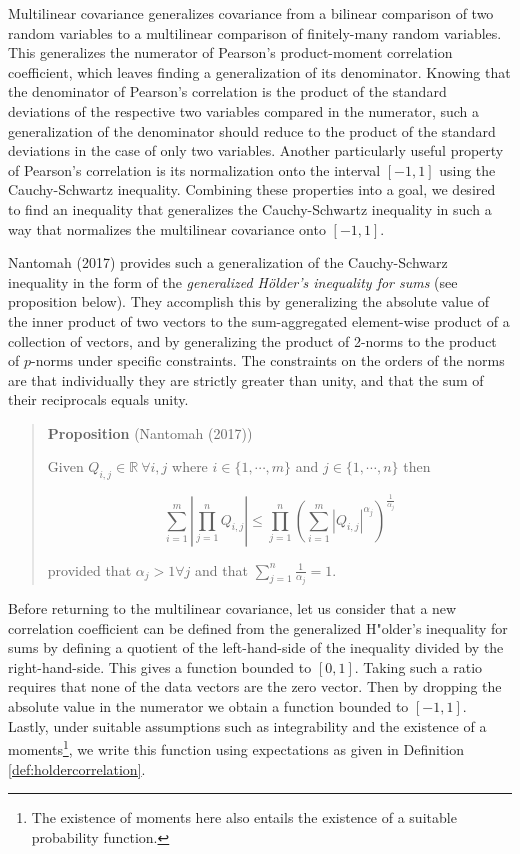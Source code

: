 \documentclass[
  letterpaper,
  DIV=11,
  numbers=noendperiod]{scrreprt}
\begin{document}
Multilinear covariance generalizes covariance from a bilinear comparison
of two random variables to a multilinear comparison of finitely-many
random variables. This generalizes the numerator of Pearson's
product-moment correlation coefficient, which leaves finding a
generalization of its denominator. Knowing that the denominator of
Pearson's correlation is the product of the standard deviations of the
respective two variables compared in the numerator, such a
generalization of the denominator should reduce to the product of the
standard deviations in the case of only two variables. Another
particularly useful property of Pearson's correlation is its
normalization onto the interval \([-1,1]\) using the Cauchy-Schwartz
inequality. Combining these properties into a goal, we desired to find
an inequality that generalizes the Cauchy-Schwartz inequality in such a
way that normalizes the multilinear covariance onto \([-1,1]\).

Nantomah (2017) provides such a generalization of the Cauchy-Schwarz
inequality in the form of the \emph{generalized Hölder's inequality for
sums} (see proposition below). They accomplish this by generalizing the
absolute value of the inner product of two vectors to the sum-aggregated
element-wise product of a collection of vectors, and by generalizing the
product of 2-norms to the product of \(p\)-norms under specific
constraints. The constraints on the orders of the norms are that
individually they are strictly greater than unity, and that the sum of
their reciprocals equals unity.

\begin{quote}
\textbf{Proposition} (Nantomah (2017))

Given \(Q_{i,j} \in \mathbb{R}\ \forall i,j\) where
\(i \in \{ 1, \cdots, m \}\) and \(j \in \{ 1, \cdots, n \}\) then

\[\sum_{i=1}^{m} \left|\prod_{j=1}^{n} Q_{i,j}\right| \leq \prod_{j=1}^{n} \left( \sum_{i=1}^{m} |Q_{i,j}|^{\alpha_j} \right)^{\frac{1}{\alpha_j}}\]

provided that \(\alpha_j > 1 \forall j\) and that
\(\sum_{j=1}^{n} \frac{1}{\alpha_j} = 1\).
\end{quote}

Before returning to the multilinear covariance, let us consider that a
new correlation coefficient can be defined from the generalized
H"older's inequality for sums by defining a quotient of the
left-hand-side of the inequality divided by the right-hand-side. This
gives a function bounded to \([0,1]\). Taking such a ratio requires that
none of the data vectors are the zero vector. Then by dropping the
absolute value in the numerator we obtain a function bounded to
\([-1,1]\). Lastly, under suitable assumptions such as integrability and
the existence of a
moments\footnote{The existence of moments here also entails the existence of a suitable probability function.},
we write this function using expectations as given in Definition
\ref{def:holdercorrelation}.
\end{document}
